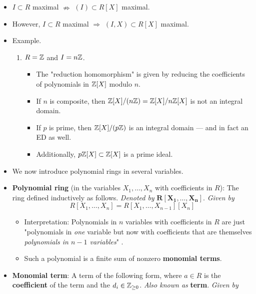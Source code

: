 \documentclass[../notes.tex]{subfiles}
\begin{document}
\begin{itemize}
\begin{proposition}
        In particular, if $I$ is a prime ideal of $R$, then $(I)$ is a prime ideal of $R[X]$.
        \begin{proof}
            Given.
        \end{proof}
    \end{proposition}
    \item $I\subset R$ maximal $\nRightarrow$ $(I)\subset R[X]$ maximal.
    \item However, $I\subset R$ maximal $\Rightarrow$ $(I,X)\subset R[X]$ maximal.
    \item Example.
    \begin{enumerate}
        \item $R=\mathbb{Z}$ and $I=n\mathbb{Z}$.
        \begin{itemize}
            \item The "reduction homomorphism" is given by reducing the coefficients of polynomials in $\mathbb{Z}[X]$ modulo $n$.
            \item If $n$ is composite, then $\mathbb{Z}[X]/(n\mathbb{Z})=\mathbb{Z}[X]/n\mathbb{Z}[X]$ is not an integral domain.
            \item If $p$ is prime, then $\mathbb{Z}[X]/(p\mathbb{Z})$ is an integral domain --- and in fact an ED as well.
            \item Additionally, $p\mathbb{Z}[X]\subset\mathbb{Z}[X]$ is a prime ideal.
        \end{itemize}
    \end{enumerate}
    \item We now introduce polynomial rings in several variables.
    \item \textbf{Polynomial ring} (in the variables $X_1,\dots,X_n$ with coefficients in $R$): The ring defined inductively as follows. \emph{Denoted by} $\bm{R[X_1,\ldots,X_n]}$. \emph{Given by}
    \begin{equation*}
        R[X_1,\dots,X_n] = R[X_1,\dots,X_{n-1}][X_n]
    \end{equation*}
    \begin{itemize}
        \item Interpretation: Polynomials in $n$ variables with coefficients in $R$ are just "polynomials in \emph{one} variable but now with coefficients that are themselves \emph{polynomials in $n-1$ variables}" \parencite[296-97]{bib:DummitFoote}.
        \item Such a polynomial is a finite sum of nonzero \textbf{monomial terms}.
    \end{itemize}
    \item \textbf{Monomial term}: A term of the following form, where $a\in R$ is the \textbf{coefficient} of the term and the $d_i\in{\mathbb{Z}_{\geq 0}}$. \emph{Also known as} \textbf{term}. \emph{Given by}

\end{itemize}
\end{document}
